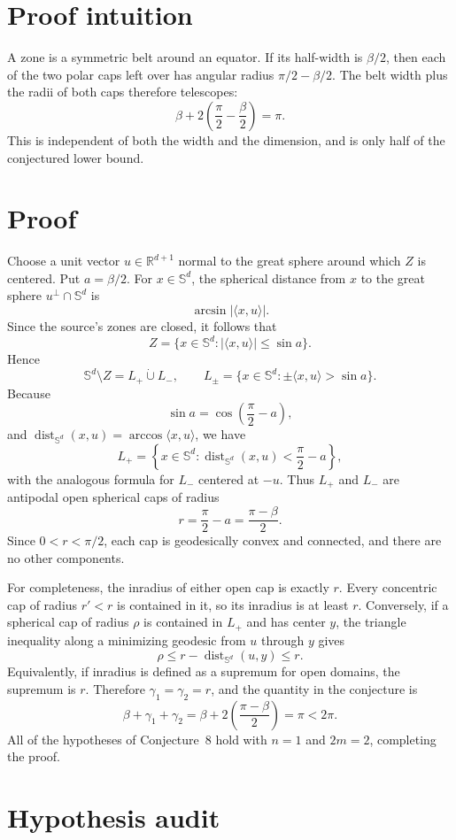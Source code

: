 \documentclass[11pt]{article}
\newcommand{\Sph}{\mathbb S^d}
\newcommand{\dist}{\operatorname{dist}_{\Sph}}
\begin{document}
\section{Proof intuition}

A zone is a symmetric belt around an equator.  If its half-width is
$\beta/2$, then each of the two polar caps left over has angular radius
$\pi/2-\beta/2$.  The belt width plus the radii of both caps therefore
telescopes:
\[
 \beta+2\left(\frac{\pi}{2}-\frac{\beta}{2}\right)=\pi.
\]
This is independent of both the width and the dimension, and is only half
of the conjectured lower bound.

\section{Proof}

Choose a unit vector $u\in\mathbb R^{d+1}$ normal to the great sphere around
which $Z$ is centered.  Put $a=\beta/2$.  For $x\in\Sph$, the spherical
distance from $x$ to the great sphere $u^\perp\cap\Sph$ is
\[
 \arcsin |\langle x,u\rangle|.
\]
Since the source's zones are closed, it follows that
\[
 Z=\{x\in\Sph:|\langle x,u\rangle|\le \sin a\}.
\]
Hence
\[
 \Sph\setminus Z=L_+\mathbin{\dot\cup}L_-,
 \qquad
 L_\pm=\{x\in\Sph:\pm\langle x,u\rangle>\sin a\}.
\]
Because
\[
 \sin a=\cos\left(\frac{\pi}{2}-a\right),
\]
and $\dist(x,u)=\arccos\langle x,u\rangle$, we have
\[
 L_+=\left\{x\in\Sph:\dist(x,u)<\frac{\pi}{2}-a\right\},
\]
with the analogous formula for $L_-$ centered at $-u$.  Thus $L_+$ and
$L_-$ are antipodal open spherical caps of radius
\[
 r=\frac{\pi}{2}-a=\frac{\pi-\beta}{2}.
\]
Since $0<r<\pi/2$, each cap is geodesically convex and connected, and there
are no other components.

For completeness, the inradius of either open cap is exactly $r$.  Every
concentric cap of radius $r'<r$ is contained in it, so its inradius is at
least $r$.  Conversely, if a spherical cap of radius $\rho$ is contained in
$L_+$ and has center $y$, the triangle inequality along a minimizing
geodesic from $u$ through $y$ gives
\[
 \rho\le r-\dist(u,y)\le r.
\]
Equivalently, if inradius is defined as a supremum for open domains, the
supremum is $r$.  Therefore $\gamma_1=\gamma_2=r$, and the quantity in the
conjecture is
\[
 \beta+\gamma_1+\gamma_2
 =\beta+2\left(\frac{\pi-\beta}{2}\right)
 =\pi<2\pi.
\]
All of the hypotheses of Conjecture~8 hold with $n=1$ and $2m=2$, completing
the proof.

\section{Hypothesis audit}
\end{document}
